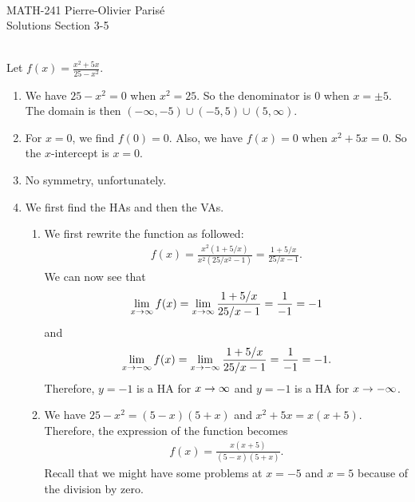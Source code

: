 


	\noindent \hrulefill \\
	MATH-241 \hfill Pierre-Olivier Paris{\'e}\\
	Solutions Section 3-5 \hfill \semester \\\vspace*{-1cm}
	
	\noindent\hrulefill
	
	\spc
	
	\\
	
	Let $f(x) = \frac{x^2 + 5x}{25 - x^2}$.
	
	\begin{enumerate}[label=\textbf{\Alph*.}]
	\item We have $25 - x^2 = 0$ when $x^2 = 25$. So the denominator is $0$ when $x = \pm 5$. The domain is then $(-\infty , -5) \cup (-5, 5) \cup (5, \infty )$.
	\item For $x = 0$, we find $f(0) = 0$. Also, we have $f(x) = 0$ when $x^2 + 5x = 0$. So the $x$-intercept is $x = 0$.
	\item No symmetry, unfortunately.
	\item We first find the HAs and then the VAs.
		\begin{enumerate}[label=\textbf{(\Roman*)}]
		\item We first rewrite the function as followed:
			\begin{align*}
			f(x) = \frac{x^2 (1 + 5/x)}{x^2(25/x^2 - 1)} = \frac{1 + 5/x}{25/x - 1} .
			\end{align*}
		We can now see that
			\begin{align*}
			\lim_{x \rightarrow \infty} f(x) = \lim_{x \rightarrow \infty} \frac{1 + 5/x}{25/x - 1} = \frac{1}{-1} = -1
			\end{align*}
		and
			\begin{align*}
			\lim_{x \rightarrow -\infty} f(x) = \lim_{x \rightarrow -\infty} \frac{1 + 5/x}{25/x - 1} = \frac{1}{-1} = -1 .
			\end{align*}
		Therefore, $y = -1$ is a HA for $x \rightarrow \infty$ and $y = -1$ is a HA for $x \rightarrow -\infty$.
		\item We have $25-x^2 = (5-x)(5 + x)$ and $x^2 + 5x = x (x + 5)$. Therefore, the expression of the function becomes
			\begin{align*}
			f(x) = \frac{x (x + 5)}{(5 - x) (5 + x)} .
			\end{align*}
		Recall that we might have some problems at $x = -5$ and $x = 5$ because of the division by zero.
		

\end{enumerate}
\end{enumerate}

